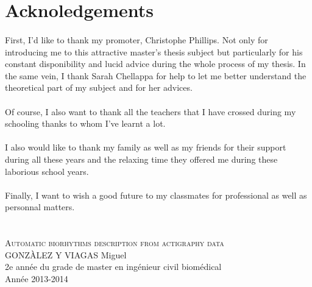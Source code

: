 \documentclass[a4paper,12pt]{article}
\begin{document}
 
 
 \section*{Acknoledgements}
 
 \paragraph{}
 First, I'd like to thank my promoter, Christophe Phillips. Not only for introducing me to this attractive master's thesis subject but particularly for his constant disponibility and lucid advice during the whole process of my thesis. In the same vein, I thank Sarah Chellappa for help to let me better understand the theoretical part of my subject and for her advices.
 
 \paragraph{}
 Of course, I also want to thank all the teachers that I have crossed during my schooling thanks to whom I've learnt a lot.
 
 \paragraph{}
 I also would like to thank my family as well as my friends for their support during all these years and the relaxing time they offered me during these laborious school years.
 
 \paragraph{}
 Finally, I want to wish a good future to my classmates for professional as well as personnal matters.

\newpage

\section*{}

\begin{center}

\textsc{\Large Automatic biorhythms description from actigraphy data} \\[3mm]

\textsc{\large GONZÀLEZ Y VIAGAS} \large Miguel \\[3mm]

2e année du grade de master en ingénieur civil biomédical \\[5mm]

Année 2013-2014

\end{center}
\end{document}
